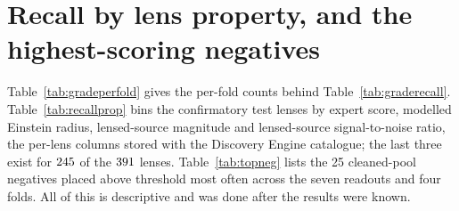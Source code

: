 \section{Recall by lens property, and the highest-scoring negatives}
\label{app:breakdowns}

Table~\ref{tab:gradeperfold} gives the per-fold counts behind Table~\ref{tab:graderecall}.
Table~\ref{tab:recallprop} bins the confirmatory test lenses by expert score, modelled Einstein
radius, lensed-source magnitude and lensed-source signal-to-noise ratio, the per-lens columns
stored with the Discovery Engine catalogue; the last three exist for $245{}$ of the
$391{}$ lenses. Table~\ref{tab:topneg} lists the 25 cleaned-pool negatives placed above
threshold most often across the seven readouts and four folds. All of this is descriptive and
was done after the results were known.






